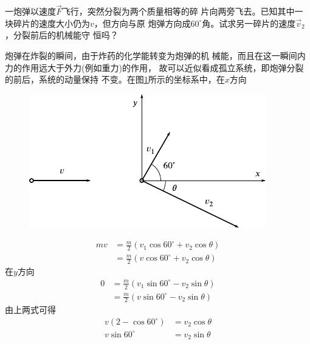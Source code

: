\example 一炮弹以速度$ \vec { F } $飞行，突然分裂为两个质量相等的碎
片向两旁飞去。已知其中一块碎片的速度大小仍为$ v $，但方向与原
炮弹方向成$ 60 ^ { \circ } $角。试求另一碎片的速度$ \vec { v } _ { 2 } $，分裂前后的机械能守
恒吗？

\resolve 炮弹在炸裂的瞬间，由于炸药的化学能转变为炮弹的机
械能，而且在这一瞬间内力的作用远大于外力(例如重力)的作用，
故可以近似看成孤立系统，即炮弹分裂的前后，系统的动量保持
不变。在图\ref{fig:08.02}所示的坐标系中，在$ x $方向
\begin{figure}[h]
  \centering
  \includegraphics{figure/fig08.02}
  \caption{}
  \label{fig:08.02}
\end{figure}
\begin{equation*}
  \begin{split}
    m v &= \frac { m } { 2 } \left( v _ { 1 } \cos 60 ^ { \circ } + v _ { 2 } \cos \theta \right)  \\
    &= \frac { m } { 2 } \left( v \cos 60 ^ { \circ } + v _ { 2 } \cos \theta \right)
  \end{split}
\end{equation*}
在$ y $方向
\begin{equation*}
  \begin{split}
    0 &= \frac { m } { 2 } \left( v _ { 1 } \sin 60 ^ { \circ } - v _ { 2 } \sin \theta \right)  \\
    &= \frac { m } { 2 } \left( v \sin 60 ^ { \circ } - v _ { 2 } \sin \theta \right)
  \end{split}
\end{equation*}
由上两式可得
\begin{equation*}
  \begin{split}
    v \left( 2 - \cos 60 ^ { \circ } \right) &= v _ { 2 } \cos \theta  \\
    v \sin 60 ^ { \circ } &= v _ { 2 } \sin \theta
  \end{split}
\end{equation*}
